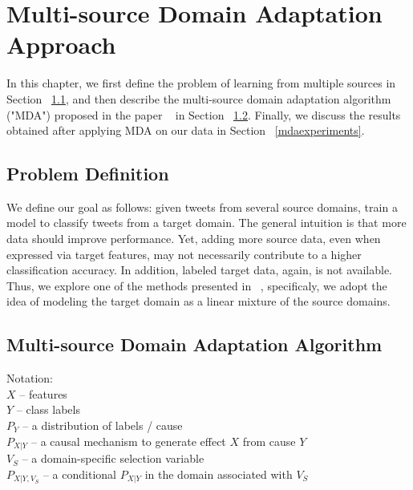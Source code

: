 \cleardoublepage

\chapter{Multi-source Domain Adaptation Approach}
\label{mdachapter}

In this chapter, we first define the problem of learning from multiple sources in Section ~\ref{mdaproblemdefinitions}, and then describe the multi-source domain adaptation algorithm ("MDA") proposed in the paper ~\citep{mda} in Section ~\ref{mdaalg}. Finally, we discuss the results obtained after applying MDA on our data in Section ~\ref{mdaexperiments}.


\section{Problem Definition}
\label{mdaproblemdefinitions}

We define our goal as follows: given tweets from several source domains, train a model to classify tweets from a target domain. The general intuition is that more data should improve performance. Yet, adding more source data, even when expressed via target features, may not necessarily contribute to a higher classification accuracy. In addition, labeled target data, again, is not available. Thus, we explore one of the methods presented in ~\citep{mda}, specificaly, we adopt the idea of modeling the target domain as a linear mixture of the source domains. 

\section{Multi-source Domain Adaptation Algorithm}
\label{mdaalg}

Notation: \\
$X$ -- features \\
$Y$ -- class labels \\
$P_Y$ -- a distribution of labels / cause \\
$P_{X|Y}$ -- a causal mechanism to generate effect $X$ from cause $Y$ \\
$V_S$ -- a domain-specific selection variable \\
$P_{X|Y, V_S}$ -- a conditional $P_{X|Y}$ in the domain associated with $V_S$

